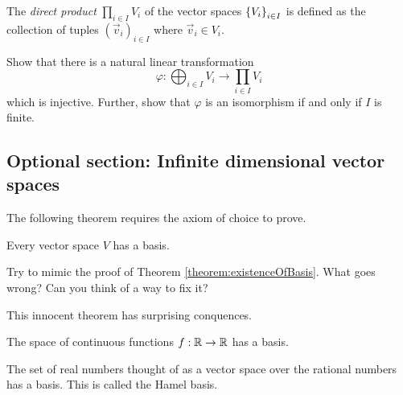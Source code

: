 \begin{definition}
  The \emph{direct product} $\prod_{i \in I} V_i$ of the vector spaces $\left\{V_i\right\}_{i \in I}$ is defined as the collection of tuples $(\vec{v}_i)_{i \in I}$ where $\vec{v}_i \in V_i$.
\end{definition}

\begin{qbox}
  Show that there is a natural linear transformation
  \begin{equation*}
    \varphi: \bigoplus_{i \in I} V_i \longrightarrow \prod_{i \in I} V_i
  \end{equation*}
  which is injective.
  Further, show that $\varphi$ is an isomorphism if and only if $I$ is finite.
\end{qbox}







\subsection{Optional section: Infinite dimensional vector spaces}
The following theorem requires the axiom of choice to prove.
\begin{theorem}
  Every vector space $V$ has a basis.
\end{theorem}
\begin{qbox}
  Try to mimic the proof of Theorem \ref{theorem:existenceOfBasis}. What goes wrong? Can you think of a way to fix it?
\end{qbox}

This innocent theorem has surprising conquences.
\begin{corollary}
  The space of continuous functions $f: \mathbb{R} \rightarrow \mathbb{R}$ has a basis.
\end{corollary}
\begin{corollary}
  The set of real numbers thought of as a vector space over the rational numbers has a basis. This is called the Hamel basis.
\end{corollary}
%
\fi
